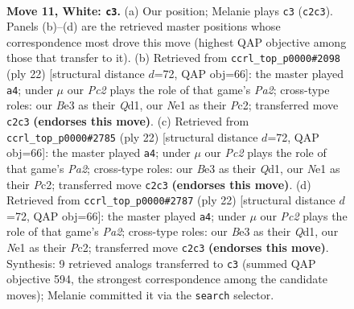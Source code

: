 \documentclass[11pt]{article}
\begin{document}
\clearpage

\begin{figure}[p]\centering
\begin{subfigure}{0.46\textwidth}\centering
\resizebox{\linewidth}{!}{%
\newchessgame
\chessboard[
  setfen={rnbq1rk1/pp3pbp/1n1p2p1/4p3/3P4/1B2B3/PPP2PPP/RN1QNRK1 w - - 0 11},
  showmover=false,
  pgfstyle=straightmove, color=movearrow, markmove={c2-c3}
]}
\caption{}
\end{subfigure}\hfill
\begin{subfigure}{0.46\textwidth}\centering
\resizebox{\linewidth}{!}{%
\newchessgame
\chessboard[
  setfen={r2q1rk1/1p1bppbp/3p1np1/p7/3BP3/1BN5/PPP2PPP/R2QR1K1 w - - 2 12},
  showmover=false,
  pgfstyle=straightmove, color=movearrow, markmove={a2-a4}
]}
\caption{}
\end{subfigure}
\\[4pt]
\begin{subfigure}{0.46\textwidth}\centering
\resizebox{\linewidth}{!}{%
\newchessgame
\chessboard[
  setfen={r2q1rk1/1p1bppbp/3p1np1/p7/3BP3/1BN5/PPP2PPP/R2QR1K1 w - - 2 12},
  showmover=false,
  pgfstyle=straightmove, color=movearrow, markmove={a2-a4}
]}
\caption{}
\end{subfigure}\hfill
\begin{subfigure}{0.46\textwidth}\centering
\resizebox{\linewidth}{!}{%
\newchessgame
\chessboard[
  setfen={r2q1rk1/1p1bppbp/3p1np1/p7/3BP3/1BN5/PPP2PPP/R2QR1K1 w - - 2 12},
  showmover=false,
  pgfstyle=straightmove, color=movearrow, markmove={a2-a4}
]}
\caption{}
\end{subfigure}
\caption{\textbf{Move 11, White: \texttt{c3}.} (a) Our position; Melanie plays \texttt{c3} (\texttt{c2c3}). Panels (b)--(d) are the retrieved master positions whose correspondence most drove this move (highest QAP objective among those that transfer to it). (b) Retrieved from \texttt{ccrl\_top\_p0000\#2098} (ply 22) [structural distance $d$=72, QAP obj=66]: the master played \texttt{a4}; under $\mu$ our \emph{Pc2} plays the role of that game's \emph{Pa2}; cross-type roles: our \emph{B}e3 as their \emph{Q}d1, our \emph{N}e1 as their \emph{P}c2; transferred move \texttt{c2c3} \textbf{(endorses this move)}. (c) Retrieved from \texttt{ccrl\_top\_p0000\#2785} (ply 22) [structural distance $d$=72, QAP obj=66]: the master played \texttt{a4}; under $\mu$ our \emph{Pc2} plays the role of that game's \emph{Pa2}; cross-type roles: our \emph{B}e3 as their \emph{Q}d1, our \emph{N}e1 as their \emph{P}c2; transferred move \texttt{c2c3} \textbf{(endorses this move)}. (d) Retrieved from \texttt{ccrl\_top\_p0000\#2787} (ply 22) [structural distance $d$=72, QAP obj=66]: the master played \texttt{a4}; under $\mu$ our \emph{Pc2} plays the role of that game's \emph{Pa2}; cross-type roles: our \emph{B}e3 as their \emph{Q}d1, our \emph{N}e1 as their \emph{P}c2; transferred move \texttt{c2c3} \textbf{(endorses this move)}. Synthesis: 9 retrieved analogs transferred to \texttt{c3} (summed QAP objective 594, the strongest correspondence among the candidate moves); Melanie committed it via the \texttt{search} selector.}
\label{fig:thought-m20}
\end{figure}
\end{document}

